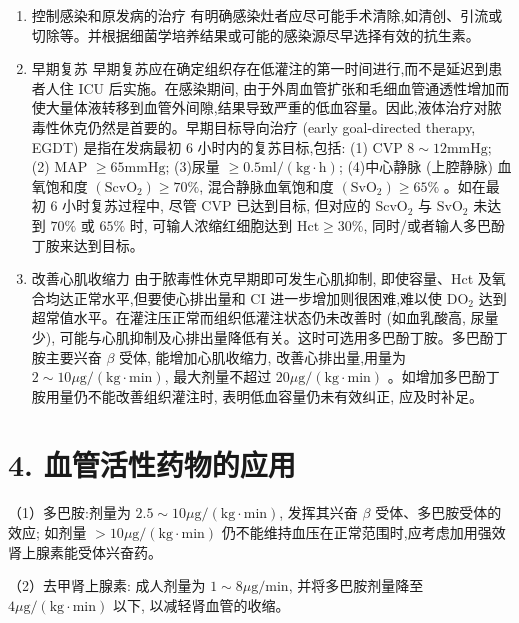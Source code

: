 \documentclass[10pt]{article}
\begin{document}
\begin{enumerate}
  \item 控制感染和原发病的治疗 有明确感染灶者应尽可能手术清除,如清创、引流或切除等。并根据细菌学培养结果或可能的感染源尽早选择有效的抗生素。

  \item 早期复苏 早期复苏应在确定组织存在低灌注的第一时间进行,而不是延迟到患者人住 ICU 后实施。在感染期间, 由于外周血管扩张和毛细血管通透性增加而使大量体液转移到血管外间隙,结果导致严重的低血容量。因此,液体治疗对脓毒性休克仍然是首要的。早期目标导向治疗 (early goal-directed therapy, EGDT) 是指在发病最初 6 小时内的复苏目标,包括: (1) CVP $8 \sim 12 \mathrm{mmHg}$; (2) MAP $\geqslant 65 \mathrm{mmHg}$; (3)尿量 $\geqslant 0.5 \mathrm{ml} /(\mathrm{kg} \cdot \mathrm{h})$; (4)中心静脉 (上腔静脉) 血氧饱和度 $\left(\mathrm{ScvO}_{2}\right) \geqslant 70 \%$, 混合静脉血氧饱和度 $\left(\mathrm{SvO}_{2}\right) \geqslant 65 \%$ 。如在最初 6 小时复苏过程中, 尽管 $\mathrm{CVP}$ 已达到目标, 但对应的 $\mathrm{ScvO}_{2}$ 与 $\mathrm{SvO}_{2}$ 未达到 $70 \%$ 或 $65 \%$ 时, 可输人浓缩红细胞达到 $\mathrm{Hct} \geqslant 30 \%$, 同时/或者输人多巴酚丁胺来达到目标。

  \item 改善心肌收缩力 由于脓毒性休克早期即可发生心肌抑制, 即使容量、Hct 及氧合均达正常水平,但要使心排出量和 CI 进一步增加则很困难,难以使 $\mathrm{DO}_{2}$ 达到超常值水平。在灌注压正常而组织低灌注状态仍未改善时 (如血乳酸高, 尿量少), 可能与心肌抑制及心排出量降低有关。这时可选用多巴酚丁胺。多巴酚丁胺主要兴奋 $\beta$ 受体, 能增加心肌收缩力, 改善心排出量,用量为 $2 \sim 10 \mu \mathrm{g} /(\mathrm{kg} \cdot \mathrm{min})$, 最大剂量不超过 $20 \mu \mathrm{g} /(\mathrm{kg} \cdot \mathrm{min})$ 。如增加多巴酚丁胺用量仍不能改善组织灌注时, 表明低血容量仍未有效纠正, 应及时补足。

\end{enumerate}

\section*{4. 血管活性药物的应用}
（1）多巴胺:剂量为 $2.5 \sim 10 \mu \mathrm{g} /(\mathrm{kg} \cdot \mathrm{min})$, 发挥其兴奋 $\beta$ 受体、多巴胺受体的效应; 如剂量 $>10 \mu \mathrm{g} /(\mathrm{kg} \cdot \mathrm{min})$ 仍不能维持血压在正常范围时,应考虑加用强效肾上腺素能受体兴奋药。

（2）去甲肾上腺素: 成人剂量为 $1 \sim 8 \mu \mathrm{g} / \mathrm{min}$, 并将多巴胺剂量降至 $4 \mu \mathrm{g} /(\mathrm{kg} \cdot \mathrm{min})$ 以下, 以减轻肾血管的收缩。
\end{document}
